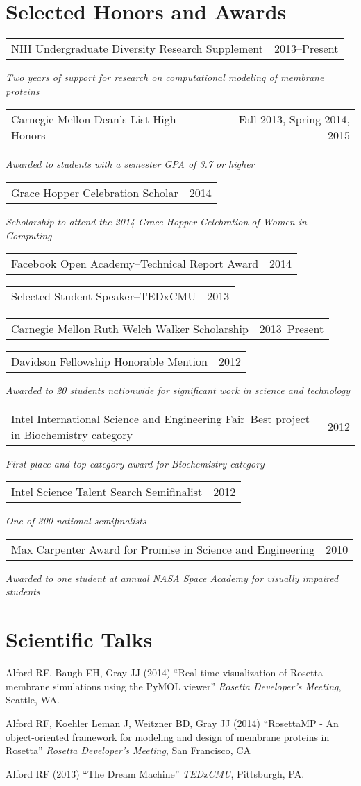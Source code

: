 \documentclass[12pt]{article}
\makeatletter
\newcommand{\allcapsspacing}[1]{{\addfontfeature{LetterSpace=7.5}#1}}
\newcommand{\leadershipitem}[3]{
\noindent
\begin{tabular*}{\textwidth}{@{\extracolsep{\fill}}lr}
		#1 & #2 \\
\end{tabular*}\newline\textit{#3}\vspace{0.75\baselineskip}\par}
\newcommand{\yearitem}[2]{
\noindent
\begin{tabular*}{\textwidth}{@{\extracolsep{\fill}}lr}
		#1 & #2 \\
\end{tabular*}\vspace{0.75\baselineskip}\par}
\makeatother
\begin{document}
\section*{\allcapsspacing{Selected Honors and Awards}}

\leadershipitem{NIH Undergraduate Diversity Research Supplement}{2013--Present}{Two years of support for research on computational modeling of membrane proteins}
\leadershipitem{Carnegie Mellon Dean's List High Honors}{Fall 2013, Spring 2014, 2015}{Awarded to students with a semester GPA of 3.7 or higher}
\leadershipitem{Grace Hopper Celebration Scholar}{2014}{Scholarship to attend the 2014 Grace Hopper Celebration of Women in Computing}
\yearitem{Facebook Open Academy--Technical Report Award}{2014}
\yearitem{Selected Student Speaker--TEDxCMU}{2013}
\yearitem{Carnegie Mellon Ruth Welch Walker Scholarship}{2013--Present}
\leadershipitem{Davidson Fellowship Honorable Mention}{2012}{Awarded to 20 students nationwide for significant work in science and technology}
\leadershipitem{Intel International Science and Engineering Fair--Best project in Biochemistry category}{2012}{First place and top category award for Biochemistry category}
\leadershipitem{Intel Science Talent Search Semifinalist}{2012}{One of 300 national semifinalists}
\leadershipitem{Max Carpenter Award for Promise in Science and Engineering}{2010}{Awarded to one student at annual NASA Space Academy for visually impaired students}

\section*{\allcapsspacing{Scientific Talks}}

\begin{etaremune}
\item Alford RF, Baugh EH, Gray JJ (2014) ``Real-time visualization of Rosetta membrane simulations using the PyMOL viewer'' \textit{Rosetta Developer's Meeting}, Seattle, WA.
\item Alford RF, Koehler Leman J, Weitzner BD, Gray JJ (2014) ``RosettaMP - An object-oriented framework for modeling and design of membrane proteins in Rosetta'' \textit{Rosetta Developer's Meeting}, San Francisco, CA
\item Alford RF (2013) ``The Dream Machine'' \textit{TEDxCMU}, Pittsburgh, PA.
\end{etaremune}

\end{document}
